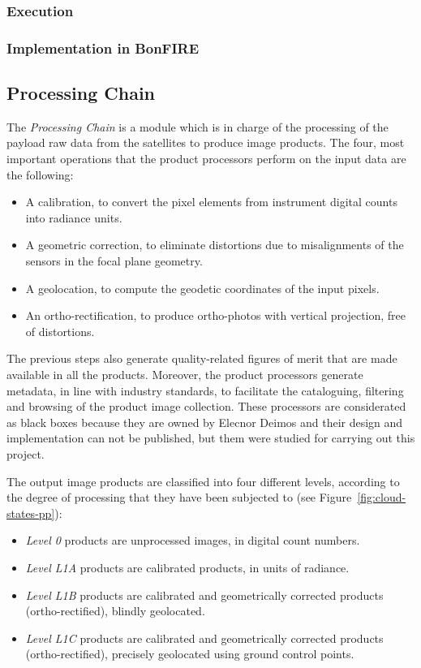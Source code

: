 \begin{enumerate}
\subsubsection{Execution}

\subsubsection{Implementation in BonFIRE}




\subsection{Processing Chain}


The \emph{Processing Chain} is a module which is in charge of the processing of the
payload raw data from the satellites to produce image products. The four, most
important operations that the product processors perform on the input data are
the following:
\begin{itemize}
\item A calibration, to convert the pixel elements from instrument digital counts into radiance units.
\item A geometric correction, to eliminate distortions due to misalignments of the sensors in the focal plane geometry.
\item A geolocation, to compute the geodetic coordinates of the input pixels.
\item An ortho-rectification, to produce ortho-photos with vertical projection, free of distortions.
\end{itemize}

The previous steps also generate quality-related figures of merit that are made
available in all the products. Moreover, the product processors generate
metadata, in line with industry standards, to facilitate the cataloguing,
filtering and browsing of the product image collection. These processors are
considerated as black boxes because they are owned by Elecnor Deimos and their
design and implementation can not be published, but them were studied for
carrying out this project.

The output image products are classified into four different levels, according to the degree of processing that they have been subjected to (see Figure~\ref{fig:cloud-states-pp}):
\begin{itemize}

\item \emph{Level 0} products are unprocessed images, in digital count numbers.
\item \emph{Level L1A} products are calibrated products, in units of radiance.
\item \emph{Level L1B} products are calibrated and geometrically corrected products (ortho-rectified), blindly geolocated.
\item \emph{Level L1C} products are calibrated and geometrically corrected products (ortho-rectified), precisely geolocated using ground control points.
\end{itemize}


\end{enumerate}
